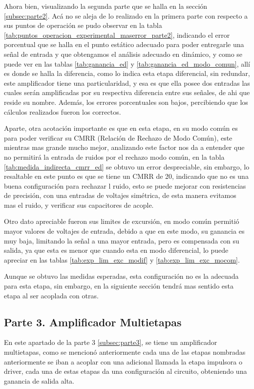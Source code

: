 Ahora bien, visualizando la segunda parte que se halla en la sección \ref{subsec:parte2}. Acá no se aleja de lo realizado en la primera parte con respecto a sus puntos de operación se pudo observar en la tabla \ref{tab:puntos_operacion_experimental_maserror_parte2}, indicando el error porcentual que se halla en el punto estático adecuado para poder entregarle una señal de entrada y que obtengamos el análisis adecuado en dinámico, y como se puede ver en las tablas \ref{tab:ganancia_ed} y \ref{tab:ganancia_ed_modo_comun}, allí es donde se halla la diferencia, como lo indica esta etapa diferencial, sin redundar, este amplificador tiene una particularidad, y esa es que ella posee dos entradas las cuales serán amplificadas por su respectiva diferencia entre sus señales, de ahi que reside su nombre. Además, los errores porcentuales son bajos, percibiendo que los cálculos realizados fueron los correctos.

Aparte, otra acotación importante es que en esta etapa, en su modo común es para poder verificar su CMRR (Relación de Rechazo de Modo Común), este mientras mas grande mucho mejor, analizando este factor nos da a entender que no permitirá la entrada de ruidos por el rechazo modo común, en la tabla \ref{tab:medida_indirecta_cmrr_ed} se obtuvo un error despreciable, sin embargo, lo resaltable en este punto es que se tiene un CMRR de 20, indicando que no es una buena configuración para rechazar l ruido, esto se puede mejorar con resistencias de precisión, con una entradas de voltajes simétrica, de esta manera evitamos mas el ruido, y verificar sus capacitores de acople.

Otro dato apreciable fueron sus limites de excursión, en modo común permitió mayor valores de voltajes de entrada, debido a que en este modo, su ganancia es muy baja, limitando la señal a una mayor entrada, pero es compensada con su salida, ya que esta es menor que cuando esta en modo diferencial, lo puede apreciar en las tablas \ref{tab:exp_lim_exc_modif} y \ref{tab:exp_lim_exc_mocom}.

Aunque se obtuvo las medidas esperadas, esta configuración no es la adecuada para esta etapa, sin embargo, en la siguiente sección tendrá mas sentido esta etapa al ser acoplada con otras.

\subsection{Parte 3. Amplificador Multietapas}

En este apartado de la parte 3 \ref{subsec:parte3}, se tiene un amplificador multietapas, como se mencionó anteriormente cada una de las etapas nombradas anteriormente se iban a acoplar con una adicional llamada la etapa impulsora o driver, cada una de estas etapas da una configuración al circuito, obteniendo una ganancia de salida alta.

